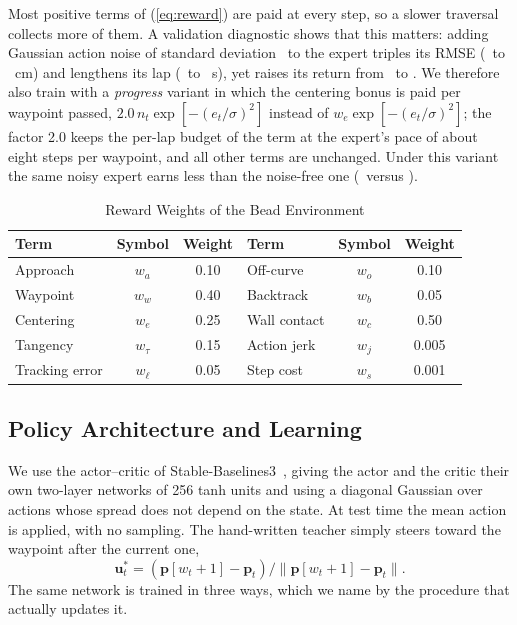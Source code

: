 \documentclass[conference]{IEEEtran}
\begin{document}
Most positive terms of (\ref{eq:reward}) are paid at every step, so a slower traversal collects more of them. A validation diagnostic shows that this matters: adding Gaussian action noise of standard deviation \VexStd\ to the expert triples its RMSE (\VexRmseZero\ to \VexRmseNoise~cm) and lengthens its lap (\VexTZero\ to \VexTNoise~s), yet raises its return from \VexRewBzero\ to \VexRewBnoise. We therefore also train with a \emph{progress} variant in which the centering bonus is paid per waypoint passed, $2.0\,n_t\exp[-(e_t/\sigma)^2]$ instead of $w_e\exp[-(e_t/\sigma)^2]$; the factor 2.0 keeps the per-lap budget of the term at the expert's pace of about eight steps per waypoint, and all other terms are unchanged. Under this variant the same noisy expert earns less than the noise-free one (\VexRewPnoise\ versus \VexRewPzero).

\begin{table}[t]
\centering
\caption{Reward Weights of the Bead Environment}
\label{tab:weights}
\setlength{\tabcolsep}{3.5pt}
\begin{tabular}{lcc|lcc}
\toprule
Term & Symbol & Weight & Term & Symbol & Weight\\
\midrule
Approach & $w_a$ & 0.10 & Off-curve & $w_o$ & 0.10\\
Waypoint & $w_w$ & 0.40 & Backtrack & $w_b$ & 0.05\\
Centering & $w_e$ & 0.25 & Wall contact & $w_c$ & 0.50\\
Tangency & $w_\tau$ & 0.15 & Action jerk & $w_j$ & 0.005\\
Tracking error & $w_\ell$ & 0.05 & Step cost & $w_s$ & 0.001\\
\bottomrule
\end{tabular}
\end{table}

\subsection{Policy Architecture and Learning}\label{sec:learning}
We use the actor--critic of Stable-Baselines3~\cite{raffin2021}, giving the actor and the critic their own two-layer networks of 256 tanh units and using a diagonal Gaussian over actions whose spread does not depend on the state. At test time the mean action is applied, with no sampling. The hand-written teacher simply steers toward the waypoint after the current one,
\begin{equation}
\mathbf{u}^{*}_t=(\mathbf{p}[w_t+1]-\mathbf{p}_t)/\|\mathbf{p}[w_t+1]-\mathbf{p}_t\|.\label{eq:expert}
\end{equation}
The same network is trained in three ways, which we name by the procedure that actually updates it.
\end{document}

